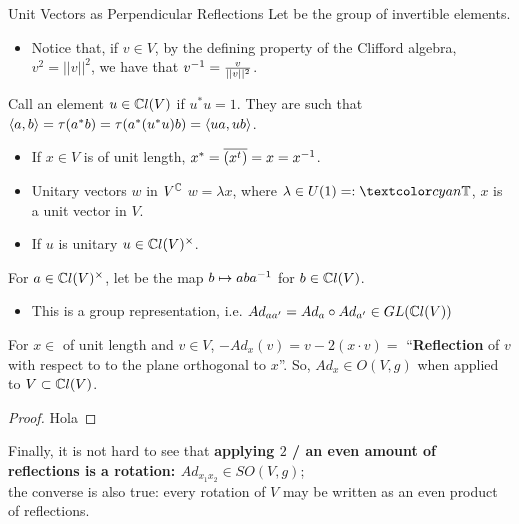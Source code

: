 \begin{frame}{Unit Vectors as Perpendicular Reflections} %
    Let  be the group of invertible elements.
        \begin{itemize}
            
        \item Notice that, if $v \in V$, by the defining property of the Clifford algebra, $v^2 = ||v||^2$, we have that $v^{-1} = \frac{v}{||v||^2}$.
            
        \end{itemize}
    
    Call an element $u \in \mathbb C l(V)$  if $u^* u = 1$. They are such that $\langle a, b \rangle = \tau(a^* b) = \tau(a^*(u^* u) b)  = \langle ua, ub \rangle$.
        \begin{itemize}
            
        \item If $x \in V$ is of unit length,  $x^* = \overline{(x^t)} = x = x^
        {-1}$.
        
        \item Unitary vectors $w$ in $V^\mathbb C$ \Iff $w = \lambda x$, where $\lambda \in U(1) =: \defn{\TT}$, $x$ is a unit vector in $V$.
        
        \item If $u$ is unitary \then $u \in \mathbb C l(V)^\times$.
            
        \end{itemize}
    

\end{frame}

\begin{frame} %

    For $a \in \mathbb C l(V)^\times$, let  be the map $b \mapsto a b a^{-1}$ for $b \in \mathbb C l(V)$. 
        \begin{itemize}
            
        \item This is a group representation, i.e. $Ad_{aa'} = Ad_a \circ Ad_{a'} \in GL(\mathbb C l(V))$ 
            
        \end{itemize}

    \begin{lemma}
    For $x \in $ of unit length and $v \in V$, $-Ad_x(v) = v - 2 (x \cdot v) = $ ``\textbf{Reflection} of $v$ with respect to to the plane orthogonal to $x$''. So, $Ad_x \in O(V, g)$ when applied to $V\subset \mathbb C l(V)$.
    \end{lemma}
    \begin{proof} Hola
    \end{proof}
    
    Finally, it is not hard to see that \textbf{applying $2$ / an even amount of reflections is a rotation: $Ad_{x_1 x_2}\in SO(V, g)$}; \\the converse is also true: every rotation of $V$ may be written as an even product of reflections.
    
\end{frame}

